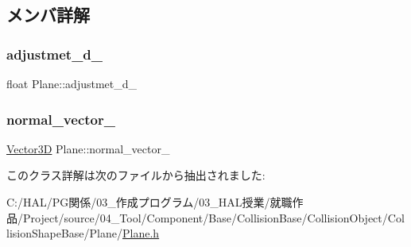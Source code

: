\subsection{メンバ詳解}
\mbox{\label{class_plane_ab43e3263bd879ea710936d85cacb6006}} 
\subsubsection{\texorpdfstring{adjustmet\+\_\+d\+\_\+}{adjustmet\_d\_}}
{\footnotesize\ttfamily float Plane\+::adjustmet\+\_\+d\+\_\+}

\mbox{\label{class_plane_abdf97ffa29f452b0faaae0b7d06f4ee5}} 
\subsubsection{\texorpdfstring{normal\+\_\+vector\+\_\+}{normal\_vector\_}}
{\footnotesize\ttfamily \mbox{\hyperlink{class_vector3_d}{Vector3D}} Plane\+::normal\+\_\+vector\+\_\+}



このクラス詳解は次のファイルから抽出されました\+:\begin{DoxyCompactItemize}
\item 
C\+:/\+H\+A\+L/\+P\+G関係/03\+\_\+作成プログラム/03\+\_\+\+H\+A\+L授業/就職作品/\+Project/source/04\+\_\+\+Tool/\+Component/\+Base/\+Collision\+Base/\+Collision\+Object/\+Collision\+Shape\+Base/\+Plane/\mbox{\hyperlink{_plane_8h}{Plane.\+h}}\end{DoxyCompactItemize}
